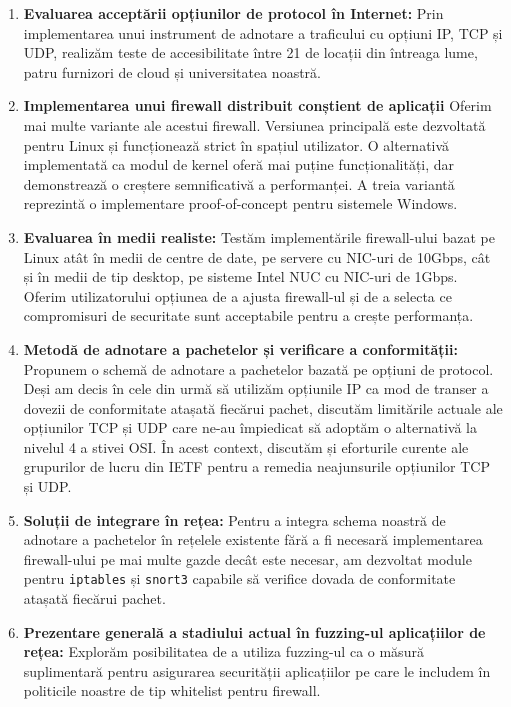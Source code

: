 \begin{enumerate}
    \item \textbf{Evaluarea acceptării opțiunilor de protocol în Internet:}
          Prin implementarea unui instrument de adnotare a traficului cu opțiuni
          IP, TCP și UDP, realizăm teste de accesibilitate între 21 de locații
          din întreaga lume, patru furnizori de cloud și universitatea noastră.
    \item \textbf{Implementarea unui firewall distribuit conștient de aplicații}
          Oferim mai multe variante ale acestui firewall. Versiunea principală
          este dezvoltată pentru Linux și funcționează strict în spațiul
          utilizator. O alternativă implementată ca modul de kernel oferă mai puține
          funcționalități, dar demonstrează o creștere semnificativă a
          performanței. A treia variantă reprezintă o implementare proof-of-concept
          pentru sistemele Windows.
    \item \textbf{Evaluarea în medii realiste:}
          Testăm implementările firewall-ului bazat pe Linux atât în medii de
          centre de date, pe servere cu NIC-uri de 10Gbps, cât și în medii de
          tip desktop, pe sisteme Intel NUC cu NIC-uri de 1Gbps. Oferim
          utilizatorului opțiunea de a ajusta firewall-ul și de a selecta ce
          compromisuri de securitate sunt acceptabile pentru a crește performanța.
    \item \textbf{Metodă de adnotare a pachetelor și verificare a conformității:}
          Propunem o schemă de adnotare a pachetelor bazată pe opțiuni de
          protocol. Deși am decis în cele din urmă să utilizăm opțiunile IP ca
          mod de transer a dovezii de conformitate atașată fiecărui pachet, discutăm
          limitările actuale ale opțiunilor TCP și UDP care ne-au împiedicat să
          adoptăm o alternativă la nivelul 4 a stivei OSI. În acest context, discutăm și
          eforturile curente ale grupurilor de lucru din IETF pentru a remedia
          neajunsurile opțiunilor TCP și UDP.
    \item \textbf{Soluții de integrare în rețea:}
          Pentru a integra schema noastră de adnotare a pachetelor în rețelele
          existente fără a fi necesară implementarea firewall-ului pe mai multe
          gazde decât este necesar, am dezvoltat module pentru \texttt{iptables}
          și \texttt{snort3} capabile să verifice dovada de conformitate atașată
          fiecărui pachet.
    \item \textbf{Prezentare generală a stadiului actual în fuzzing-ul aplicațiilor de rețea:}
          Explorăm posibilitatea de a utiliza fuzzing-ul ca o măsură
          suplimentară pentru asigurarea securității aplicațiilor pe care le
          includem în politicile noastre de tip whitelist pentru firewall.
\end{enumerate}

